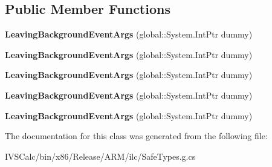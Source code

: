 \subsection*{Public Member Functions}
\begin{DoxyCompactItemize}
\item 
\mbox{\label{class_windows_1_1_application_model_1_1_leaving_background_event_args_adea8b85e0fa1f9f7b3f698eb7836073a}} 
{\bfseries Leaving\+Background\+Event\+Args} (global\+::\+System.\+Int\+Ptr dummy)
\item 
\mbox{\label{class_windows_1_1_application_model_1_1_leaving_background_event_args_adea8b85e0fa1f9f7b3f698eb7836073a}} 
{\bfseries Leaving\+Background\+Event\+Args} (global\+::\+System.\+Int\+Ptr dummy)
\item 
\mbox{\label{class_windows_1_1_application_model_1_1_leaving_background_event_args_adea8b85e0fa1f9f7b3f698eb7836073a}} 
{\bfseries Leaving\+Background\+Event\+Args} (global\+::\+System.\+Int\+Ptr dummy)
\item 
\mbox{\label{class_windows_1_1_application_model_1_1_leaving_background_event_args_adea8b85e0fa1f9f7b3f698eb7836073a}} 
{\bfseries Leaving\+Background\+Event\+Args} (global\+::\+System.\+Int\+Ptr dummy)
\item 
\mbox{\label{class_windows_1_1_application_model_1_1_leaving_background_event_args_adea8b85e0fa1f9f7b3f698eb7836073a}} 
{\bfseries Leaving\+Background\+Event\+Args} (global\+::\+System.\+Int\+Ptr dummy)
\end{DoxyCompactItemize}


The documentation for this class was generated from the following file\+:\begin{DoxyCompactItemize}
\item 
I\+V\+S\+Calc/bin/x86/\+Release/\+A\+R\+M/ilc/Safe\+Types.\+g.\+cs\end{DoxyCompactItemize}
